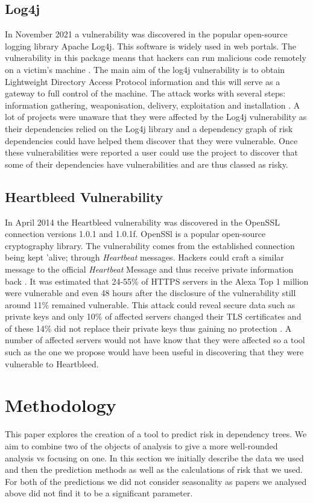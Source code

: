 \documentclass[10pt, compsoc, conference]{IEEEtran}
\begin{document}
\subsection{Log4j}
In November 2021 a vulnerability was discovered in the popular open-source logging library Apache Log4j. This software is widely used in web portals. The vulnerability in this package means that hackers can run malicious code remotely on a victim's machine \cite{h_gupta_identification_2022}. The main aim of the log4j vulnerability is to obtain Lightweight Directory Access Protocol information and this will serve as a gateway to full control of the machine. The attack works with several steps: information gathering, weaponisation, delivery, exploitation and installation \cite{f_maulana_unmasking_2023}. A lot of projects were unaware that they were affected by the Log4j vulnerability as their dependencies relied on the Log4j library and a dependency graph of risk dependencies could have helped them discover that they were vulnerable. Once these vulnerabilities were reported a user could use the project to discover that some of their dependencies have vulnerabilities and are thus classed as risky. 

\subsection{Heartbleed Vulnerability}
In April 2014 the Heartbleed vulnerability was discovered in the OpenSSL connection versions 1.0.1 and 1.0.1f. OpenSSl is a popular open-source cryptography library. The vulnerability comes from the established connection being kept 'alive; through \textit{Heartbeat} messages. Hackers could craft a similar message to the official \textit{Heartbeat} Message and thus receive private information back \cite{s_kyatam_heartbleed_2017}. It was estimated that 24-55\% of HTTPS servers in the Alexa Top 1 million were vulnerable and even 48 hours after the disclosure of the vulnerability still around 11\% remained vulnerable. This attack could reveal secure data such as private keys and only 10\% of affected servers changed their TLS certificates and of these 14\% did not replace their private keys thus gaining no protection \cite{durumeric_matter_2014}. A number of affected servers would not have know that they were affected so a tool such as the one we propose would have been useful in discovering that they were vulnerable to Heartbleed. 

\section{Methodology}
This paper explores the creation of a tool to predict risk in dependency trees. We aim to combine two of the objects of analysis to give a more well-rounded analysis vs focusing on one. In this section we initially describe the data we used and then the prediction methods as well as the calculations of risk that we used. For both of the predictions we did not consider seasonality as papers we analysed above did not find it to be a significant parameter. 
\end{document}
